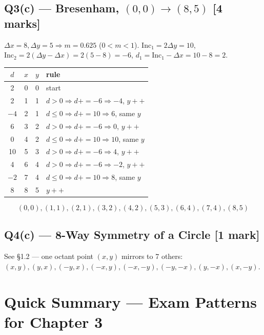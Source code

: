 \documentclass[12pt, a4paper]{article}
\newenvironment{solutionbox}{\begin{mdframed}[style=solutionframe]}{\end{mdframed}}
\newenvironment{answerbox}{\begin{mdframed}[style=answerframe]}{\end{mdframed}}
\begin{document}
\subsection*{Q3(c) --- Bresenham, $(0,0)\to(8,5)$ [4 marks]}
$\Delta x=8,\Delta y=5\Rightarrow m=0.625$ ($0<m<1$). $\mathrm{Inc}_1=2\Delta y=10$, $\mathrm{Inc}_2=2(\Delta y-\Delta x)=2(5-8)=-6$, $d_1=\mathrm{Inc}_1-\Delta x=10-8=2$.
\begin{solutionbox}
\begin{center}
\begin{tabular}{cccl}
\toprule
$d$ & $x$ & $y$ & rule \\
\midrule
2 & 0 & 0 & start \\
2 & 1 & 1 & $d>0\Rightarrow d{+}{=}{-}6\Rightarrow{-}4$, $y{+}{+}$ \\
$-4$ & 2 & 1 & $d\le0\Rightarrow d{+}{=}10\Rightarrow6$, same $y$ \\
6 & 3 & 2 & $d>0\Rightarrow d{+}{=}{-}6\Rightarrow0$, $y{+}{+}$ \\
0 & 4 & 2 & $d\le0\Rightarrow d{+}{=}10\Rightarrow10$, same $y$ \\
10 & 5 & 3 & $d>0\Rightarrow d{+}{=}{-}6\Rightarrow4$, $y{+}{+}$ \\
4 & 6 & 4 & $d>0\Rightarrow d{+}{=}{-}6\Rightarrow{-}2$, $y{+}{+}$ \\
$-2$ & 7 & 4 & $d\le0\Rightarrow d{+}{=}10\Rightarrow8$, same $y$ \\
8 & 8 & 5 & $y{+}{+}$ \\
\bottomrule
\end{tabular}
\end{center}
\end{solutionbox}
\begin{answerbox}
$$(0,0),(1,1),(2,1),(3,2),(4,2),(5,3),(6,4),(7,4),(8,5)$$
\end{answerbox}

\subsection*{Q4(c) --- 8-Way Symmetry of a Circle [1 mark]}
See \S1.2 --- one octant point $(x,y)$ mirrors to 7 others: $(x,y),(y,x),(-y,x),(-x,y),(-x,-y),(-y,-x),(y,-x),(x,-y)$.

\section{Quick Summary --- Exam Patterns for Chapter 3}
\end{document}
